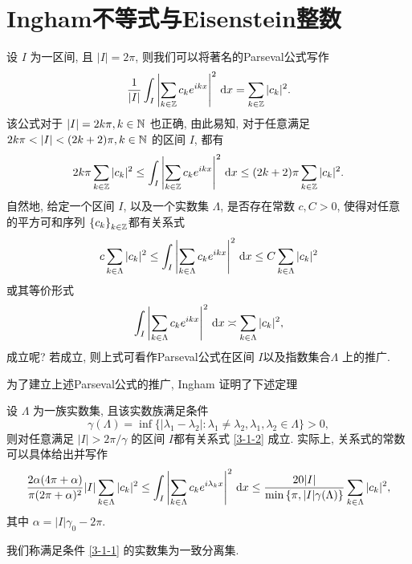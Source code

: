     \section{Ingham不等式与Eisenstein整数}
    设 $I$ 为一区间, 且 $|I|=2\pi$, 则我们可以将著名的Parseval公式写作
    \begin{equation*}
        \frac{1}{|I|} \int_I \left| \sum_{k\in \mathbb{Z}} c_k e^{ikx}\right|^2 \,\mathrm{d} x = \sum_{k\in \mathbb{Z}} |c_k|^2.
    \end{equation*}
    该公式对于 $|I|=2k\pi, k\in \mathbb{N}$ 也正确, 由此易知, 对于任意满足 $2k\pi <|I|<(2k+2)\pi,k\in\N$ 的区间 $I$, 都有
    \begin{equation*}
        2k\pi \sum_{k\in \mathbb{Z}}|c_k|^2 \le \int _I \left| \sum_{k\in \mathbb{Z}}c_ke^{ikx} \right|^2\,\mathrm{d} x \le (2k+2)\pi  \sum_{k\in\mathbb{Z} }|c_k|^2. 
    \end{equation*}
    自然地, 给定一个区间 $I$, 以及一个实数集 $\Lambda$, 是否存在常数 $c,C>0$, 使得对任意的平方可和序列 $\left\{c_k\right\}_{k\in \mathbb{Z}}$都有关系式
    \begin{equation}
        c \sum_{k\in \Lambda} |c_k|^2 \le \int _I \left| \sum_{k\in \Lambda} c_k e^{ikx} \right|^2 \,\mathrm{d} x \le C \sum_{k\in \Lambda}|c_k|^2
    \end{equation}
    或其等价形式
    \begin{equation}\label{3-1-2}
        \int _I \left| \sum_{k\in \Lambda} c_k e^{ikx} \right|^2 \,\mathrm{d} x\asymp \sum_{k\in \Lambda}|c_k|^2,
    \end{equation}
    成立呢? 若成立, 则上式可看作Parseval公式在区间 $I$以及指数集合$\Lambda$ 上的推广. 
    
    为了建立上述Parseval公式的推广, Ingham \cite{Ingham1936} 证明了下述定理
    \begin{theorem}\label{thm-ingham}
    设 $\Lambda$ 为一族实数集, 且该实数族满足条件
    \begin{equation}\label{3-1-1}
        \gamma(\Lambda)=\inf\lbrace |\lambda_1-\lambda_2|: \lambda_1\neq \lambda_2, \lambda_1,\lambda_2\in \Lambda\rbrace>0,
    \end{equation}
     则对任意满足 $|I|>2\pi /\gamma$ 的区间 $I$都有关系式 \eqref{3-1-2} 成立. 实际上, 关系式的常数可以具体给出并写作
     \begin{equation}
         \frac{2\alpha(4\pi+\alpha)}{\pi(2\pi+\alpha)^2}|I|\sum_{k\in\Lambda}|c_k|^2\le \int_{I}\left|\sum_{k\in \Lambda}c_ke^{i\lambda_kx}\right|^2\,\mathrm{d} x\le \frac{20 |I|}{\min\left\{\pi,|I|\gamma(\Lambda)\right\}}\sum_{k\in\Lambda}|c_k|^2,
     \end{equation}
     其中 $\alpha=|I|\gamma_0-2\pi$.
     
      我们称满足条件 \eqref{3-1-1} 的实数集为一致分离集. 
    \end{theorem}
    
